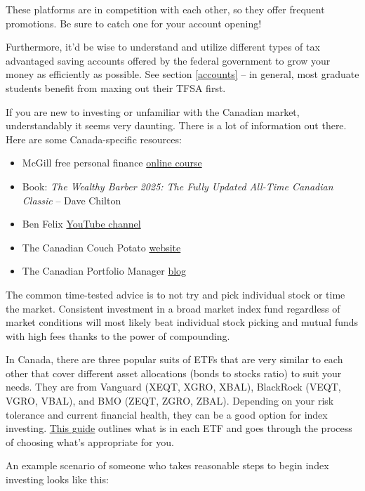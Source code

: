 These platforms are in competition with each other, so they offer frequent promotions. Be sure to catch one for your account opening!

Furthermore, it'd be wise to understand and utilize different types of tax advantaged saving accounts offered by the federal government to grow your money as efficiently as possible. See section \hyperref[accounts]{\textcolor{purble}{\ref*{accounts}}} -- in general, most graduate students benefit from maxing out their TFSA first.

If you are new to investing or unfamiliar with the Canadian market, understandably it seems very daunting. There is a lot of information out there. Here are some Canada-specific resources:
\begin{itemize}
    \item McGill free personal finance \href{https://mcgillpersonalfinance.com/}{online course}
    \item Book: \textit{The Wealthy Barber 2025: The Fully Updated All-Time Canadian Classic} -- Dave Chilton
    \item Ben Felix \href{https://www.youtube.com/@BenFelixCSI/playlists}{YouTube channel}
    \item The Canadian Couch Potato \href{https://canadiancouchpotato.com/}{website}
    \item The Canadian Portfolio Manager \href{https://canadianportfoliomanagerblog.com/model-etf-portfolios/}{blog}
\end{itemize}

The common time-tested advice is to not try and pick individual stock or time the market. Consistent investment in a broad market index fund regardless of market conditions will most likely beat individual stock picking and mutual funds with high fees thanks to the power of compounding.

In Canada, there are three popular suits of ETFs that are very similar to each other that cover different asset allocations (bonds to stocks ratio) to suit your needs. They are from Vanguard (XEQT, XGRO, XBAL), BlackRock (VEQT, VGRO, VBAL), and BMO (ZEQT, ZGRO, ZBAL). Depending on your risk tolerance and current financial health, they can be a good option for index investing. \href{https://canadianportfoliomanagerblog.com/model-etf-portfolios/}{This guide} outlines what is in each ETF and goes through the process of choosing what's appropriate for you.


An example scenario of someone who takes reasonable steps to begin index investing looks like this:

